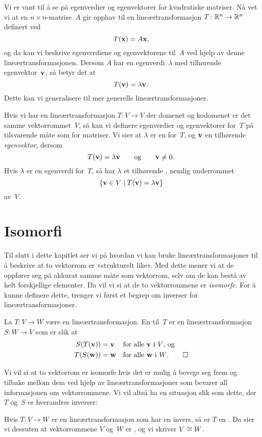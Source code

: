 Vi er vant til å se på egenverdier og egenvektorer for kvadratiske
matriser.  Nå vet vi at en $n \times n$-matrise~$A$ gir opphav til en
lineærtransformasjon $T \colon \mathbb{R}^n \to \mathbb{R}^n$ definert ved
\[
T(\mathbf{x}) = A\mathbf{x},
\]
og da kan vi beskrive egenverdiene og egenvektorene til~$A$ ved hjelp
av denne lineærtransformasjonen.  Dersom $A$ har en
egenverdi~$\lambda$ med tilhørende egenvektor~$\mathbf{v}$, så betyr det at
\[
T(\mathbf{v}) = \lambda \mathbf{v}.
\]
Dette kan vi generalisere til mer generelle lineærtransformasjoner.

Hvis vi har en lineærtransformasjon $T \colon V \to V$ der domenet og
kodomenet er det samme vektorrommet~$V$, så kan vi definere
egenverdier og egenvektorer for~$T$ på tilsvarende måte som for
matriser.  Vi sier at $\lambda$ er en  for~$T$, og
$\mathbf{v}$ en tilhørende \emph{egenvektor}, dersom
\[
T(\mathbf{v}) = \lambda \mathbf{v}
\qquad\text{og}\qquad
\mathbf{v} \ne 0.
\]
Hvis $\lambda$ er en egenverdi for~$T$, så har $\lambda$ et tilhørende
, nemlig underrommet
\[
\{ \mathbf{v} \in V \mid T(\mathbf{v}) = \lambda \mathbf{v} \}
\]
av~$V$.


\section*{Isomorfi}

Til slutt i dette kapitlet ser vi på hvordan vi kan bruke
lineærtransformasjoner til å beskrive at to vektorrom er «strukturelt
like».  Med dette mener vi at de oppfører seg på akkurat samme måte
som vektorrom, selv om de kan bestå av helt forskjellige elementer.
Da vil vi si at de to vektorrommene er \emph{isomorfe}.  For å kunne
definere dette, trenger vi først et begrep om inverser for
lineærtransformasjoner.

\begin{defn}
La $T \colon V \to W$ være en lineærtransformasjon.  En
 til~$T$ er en lineærtransformasjon $S \colon W \to V$
som er slik at
\begin{align*}
S(T(\mathbf{v})) &= \mathbf{v} &&\text{for alle $\mathbf{v}$ i~$V$, og} \\
T(S(\mathbf{w})) &= \mathbf{w} &&\text{for alle $\mathbf{w}$ i~$W$.}
\qedhere
\end{align*}
\end{defn}

Vi vil si at to vektorrom er isomorfe hvis det er mulig å bevege seg
frem og tilbake mellom dem ved hjelp av lineærtransformasjoner som
bevarer all informasjonen om vektorrommene.  Vi vil altså ha en
situasjon slik som dette, der $T$ og~$S$ er hverandres inverser:
\begin{center}
\end{center}
\begin{defn}
Hvis $T \colon V \to W$ er en lineærtransformasjon som har en invers,
så er $T$ en .  Da sier vi dessuten at vektorrommene
$V$ og~$W$ er , og vi skriver $V \cong W$.
\end{defn}

